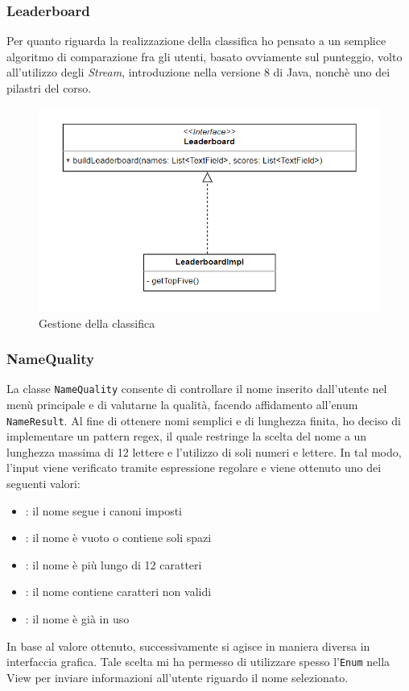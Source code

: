 \documentclass[a4paper,12pt]{report}
\begin{document}
\subsubsection{Leaderboard}
Per quanto riguarda la realizzazione della classifica ho pensato a un semplice algoritmo di comparazione fra gli utenti, basato ovviamente sul punteggio, volto all'utilizzo degli \textit{Stream}, introduzione nella versione 8 di Java, nonchè uno dei pilastri del corso. 
\begin{figure}[H]
    \begin{center}
        \centering
        \includegraphics[width=\textwidth]{img/Severi/Leaderboard.png}
    \end{center}
    \caption{Gestione della classifica}
    \label{img:leaderboard}
\end{figure}

\subsubsection{NameQuality}
La classe \texttt{NameQuality} consente di controllare il nome inserito dall'utente nel menù principale e di valutarne la qualità, facendo affidamento all'enum \texttt{NameResult}. Al fine di ottenere nomi semplici e di lunghezza finita, ho deciso di implementare un pattern regex, il quale restringe la scelta del nome a un lunghezza massima di 12 lettere e l'utilizzo di soli numeri e lettere. In tal modo, l'input viene verificato tramite espressione regolare e viene ottenuto uno dei seguenti valori:
\begin{itemize}
    \item {}: il nome segue i canoni imposti
    \item {}: il nome è vuoto o contiene soli spazi
    \item {}: il nome è più lungo di 12 caratteri
    \item {}: il nome contiene caratteri non validi
    \item {}: il nome è già in uso
\end{itemize}
\noindent In base al valore ottenuto, successivamente si agisce in maniera diversa in interfaccia grafica. Tale scelta mi ha permesso di utilizzare spesso l'\texttt{Enum} nella View per inviare informazioni all'utente riguardo il nome selezionato.
\end{document}
